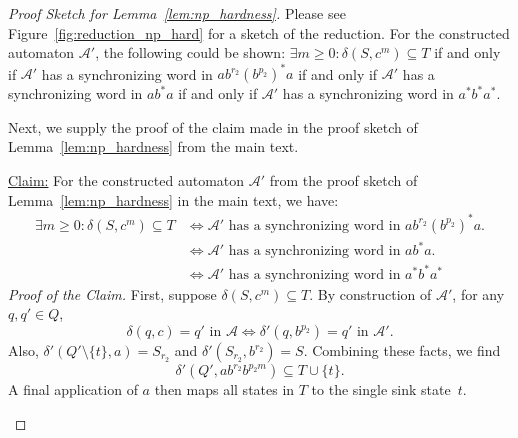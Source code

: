 \begin{proof}[Proof Sketch for Lemma~\ref{lem:np_hardness}]
Please see Figure~\ref{fig:reduction_np_hard} for a sketch
of the reduction.
For the constructed automaton $\mathcal A'$, the following could be shown:
$\exists m \ge 0 : \delta(S, c^m) \subseteq T$
if and only if $\mathcal A'$ has a synchronizing word in $ab^{r_2}(b^{p_2})^*a$
if and only if $\mathcal A'$ has a synchronizing word in $ab^*a$
if and only if $\mathcal A'$ has a synchronizing word in $a^*b^*a^*$.

\begin{toappendix}

Next, we supply the proof of the claim made in the proof sketch of Lemma~\ref{lem:np_hardness}
from the main text.

\medskip

\noindent\underline{Claim:} 
 For the constructed automaton $\mathcal A'$ from
 the proof sketch of Lemma~\ref{lem:np_hardness} in the main text, we have:
\begin{align*}
    \exists m \ge 0 : \delta(S, c^m) \subseteq T 
                               & \Leftrightarrow \mathcal A'\mbox{ has a synchronizing word in $ab^{r_2}(b^{p_2})^*a$.} \\
                               & \Leftrightarrow \mathcal A'\mbox{ has a synchronizing word in $ab^*a$.} \\
                               & \Leftrightarrow \mathcal A'\mbox{ has a synchronizing word in $a^*b^*a^*$}
\end{align*} 
 \emph{Proof of the Claim.}
 First, suppose $\delta(S, c^m) \subseteq T$.
 By construction of $\mathcal A'$,
 for any $q, q' \in Q$,
 \begin{equation}\label{eqn:transition_Astar}
  \delta(q, c) = q'  \mbox{ in $\mathcal A$}  \Leftrightarrow \delta'(q, b^{p_2}) = q'  \mbox{ in $\mathcal A'$} .
 \end{equation}
 Also, $\delta'(Q'\setminus\{t\},a) = S_{r_2}$
 and $\delta'(S_{r_2}, b^{r_2}) = S$.
 Combining these facts, we find
 \[
  \delta'(Q', ab^{r_2}b^{p_2m}) \subseteq T \cup \{t\}. 
 \]
 A final application of $a$ then maps
 all states in $T$ to the single sink %
 state~$t$.
 

\end{toappendix}
\end{proof}
